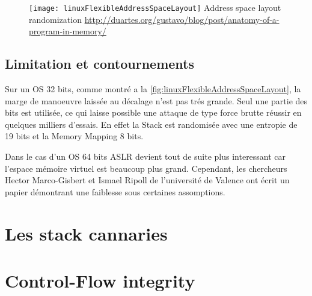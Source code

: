 \begin{figure}[H]
	\centering
	\texttt{[image: linuxFlexibleAddressSpaceLayout]}
	{Address space layout randomization}
	{\url{http://duartes.org/gustavo/blog/post/anatomy-of-a-program-in-memory/}}
	\label{fig:linuxFlexibleAddressSpaceLayout}
\end{figure}

\subsection{Limitation et contournements}

Sur un OS 32 bits, comme montré a la \autoref{fig:linuxFlexibleAddressSpaceLayout}, la marge de manoeuvre laissée au décalage n'est pas trés grande. Seul une partie des bits est utilisée, ce qui laisse possible une attaque de type force brutte réussir en quelques milliers d'essais. En effet la Stack est randomisée avec une entropie de 19 bits et la Memory Mapping 8 bits.

Dans le cas d'un OS 64 bits ASLR devient tout de suite plus interessant car l'espace mémoire virtuel est beaucoup plus grand. Cependant, les chercheurs Hector Marco-Gisbert et Ismael Ripoll de l'université de Valence ont écrit un papier démontrant une faiblesse sous certaines assomptions. \cite{EffectivenessFullASLR64bit}

\section{Les stack cannaries}




\section{Control-Flow integrity}




